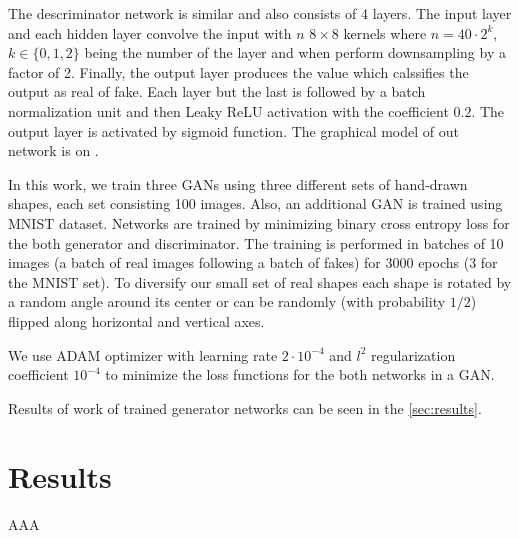 \documentclass[reprint,amsmath,amssymb,aps,pre,showkeys,showpacs]{revtex4-1}
\newcommand{\highlight}[1]{{\color{red}{#1}}} %
\begin{document}
The descriminator network is similar and also consists of 4 layers. The input
layer and each hidden layer convolve the input with $n$ $8 \times 8$ kernels
where $n = 40 \cdot 2^{k}$, $k \in \{0, 1, 2\}$ being the number of the layer
and when perform downsampling by a factor of 2. Finally, the output layer
produces the value which calssifies the output as real of fake. Each layer but
the last is followed by a batch normalization unit and then Leaky ReLU
activation with the coefficient $0.2$. The output layer is activated by sigmoid
function. The graphical model of out network is on \highlight{figure}.

In this work, we train three GANs using three different sets of hand-drawn
shapes, each set consisting 100 images. Also, an additional GAN is trained using
MNIST dataset. Networks are trained by minimizing binary cross entropy loss for the both
generator and discriminator. The training is performed in batches of 10 images
(a batch of real images following a batch of fakes) for 3000 epochs (3 for the
MNIST set). To diversify our small set of real shapes each shape is rotated by a
random angle around its center or can be randomly (with probability $1/2$)
flipped along horizontal and vertical axes.

We use ADAM optimizer with learning rate $2 \cdot 10^{-4}$ and $l^2$
regularization coefficient $10^{-4}$ to minimize the loss functions for the both
networks in a GAN.

Results of work of trained generator networks can be seen in the
\cref{sec:results}.

\section{Results}
AAA


\end{document}
